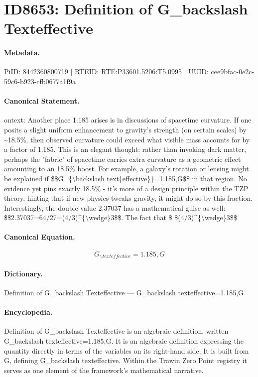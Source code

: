 \section*{ID8653: Definition of G\_backslash Texteffective}
\paragraph{Metadata.}
PiID: 8442360800719 | RTEID: RTE:P33601.5206:T5.0995 | UUID: cee9bfac-0e2c-59c6-b923-cfb0677a1f9a

\paragraph{Canonical Statement.}
ontext: Another place 1.185 arises is in discussions of spacetime curvature. If one posits a slight uniform enhancement to gravity's strength (on certain scales) by \textasciitilde{}18.5\%, then observed curvature could exceed what visible mass accounts for by a factor of 1.185. This is an elegant thought: rather than invoking dark matter, perhaps the "fabric" of spacetime carries extra curvature as a geometric effect amounting to an 18.5\% boost. For example, a galaxy's rotation or lensing might be explained if \$\$G\_\{\textbackslash{}backslash text\{effective\}\}=1.185,G\$\$ in that region. No evidence yet pins exactly 18.5\% - it's more of a design principle within the TZP theory, hinting that if new physics tweaks gravity, it might do so by this fraction. Interestingly, the double value 2.37037 has a mathematical guise as well: \$\$2.37037=64/27=(4/3)\textasciicircum{}\{\textbackslash{}wedge\}3\$\$. The fact that \$ \$(4/3)\textasciicircum{}\{\textbackslash{}wedge\}3\$\$

\paragraph{Canonical Equation.}
\[
G_{\backslash text{effective}}=1.185,G
\]

\paragraph{Dictionary.}
Definition of G\_backslash Texteffective — G\_backslash texteffective=1.185,G

\paragraph{Encyclopedia.}
Definition of G\_backslash Texteffective is an algebraic definition, written G\_backslash texteffective=1.185,G. It is an algebraic definition expressing the quantity directly in terms of the variables on its right-hand side. It is built from G, defining G\_backslash texteffective. Within the Trawin Zero Point registry it serves as one element of the framework's mathematical narrative.
